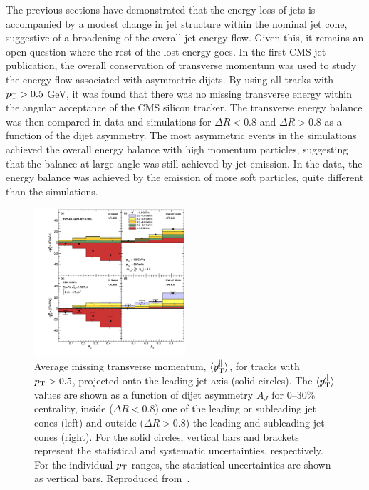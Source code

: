 The previous sections have demonstrated that the energy loss of jets is accompanied by a modest
change in jet structure within the nominal jet cone, suggestive of a broadening of the overall
jet energy flow.
Given this, it remains an open question where the rest of the lost energy goes.  
In the first CMS jet publication, the overall conservation of transverse momentum was used to 
study the energy flow associated with asymmetric dijets.  By using all tracks with $\mbox{$p_{\mathrm{T}}$}>0.5$ GeV,
it was found that there was no missing transverse energy within the angular acceptance of the
CMS silicon tracker.  
The transverse energy balance was then compared in data and simulations 
for $\Delta R<0.8$ and $\Delta R >0.8$ as a function of the dijet asymmetry.
The most asymmetric events in the simulations achieved the overall energy balance 
with high momentum particles, suggesting that the balance at large angle was still achieved
by jet emission.  In the data, the energy balance was achieved by the emission of more 
soft particles, quite different than the simulations.

\begin{figure}[!ht]
\begin{center}
\includegraphics[width=0.5\textwidth]{jetfigures/missingPtParallel-Corrected-data-InConeOutConeDPhiCut_ntv6_2.pdf}
\caption{Average missing transverse momentum,
$\langle \displaystyle{\not} p_{\mathrm{T}}^{\parallel} \rangle$,
for tracks with $\mbox{$p_{\mathrm{T}}$} > 0.5$\GeVc, projected onto the leading jet axis (solid circles).
The $\langle \displaystyle{\not} p_{\mathrm{T}}^{\parallel} \rangle$ values are
shown as a function of dijet asymmetry
$A_J$ for 0--30\% centrality, inside ($\Delta R < 0.8$) one of the leading or subleading jet cones (left) and
outside ($\Delta R > 0.8$) the leading and subleading jet cones (right).
For the solid circles, vertical bars and brackets represent
the statistical and systematic uncertainties, respectively.
For the individual $\mbox{$p_{\mathrm{T}}$}$ ranges, the statistical uncertainties are shown as vertical bars.
Reproduced from~\cite{Chatrchyan:2011sx}.}
\label{fig:GR:CMS_missingpT}
\end{center}
\end{figure}

